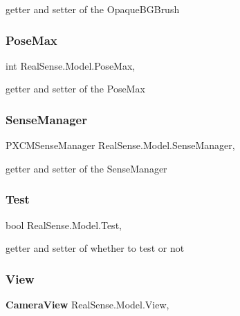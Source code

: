 getter and setter of the Opaque\+B\+G\+Brush \mbox{\label{class_real_sense_1_1_model_a556c083ee213249d05c2383ffc8e46f4}} 
\subsubsection{Pose\+Max}
{\footnotesize\ttfamily int Real\+Sense.\+Model.\+Pose\+Max\hspace{0.3cm}{\ttfamily [get]}, {\ttfamily [set]}}

getter and setter of the Pose\+Max \mbox{\label{class_real_sense_1_1_model_a396ec458576859184ac7e39d9be13465}} 
\subsubsection{Sense\+Manager}
{\footnotesize\ttfamily P\+X\+C\+M\+Sense\+Manager Real\+Sense.\+Model.\+Sense\+Manager\hspace{0.3cm}{\ttfamily [get]}, {\ttfamily [set]}}

getter and setter of the Sense\+Manager \mbox{\label{class_real_sense_1_1_model_a89f4614b0f880fb6553ebcea3d2e6a6c}} 
\subsubsection{Test}
{\footnotesize\ttfamily bool Real\+Sense.\+Model.\+Test\hspace{0.3cm}{\ttfamily [get]}, {\ttfamily [set]}}

getter and setter of whether to test or not \mbox{\label{class_real_sense_1_1_model_ad06548f5b1e3b3bfeaca2635d2b24fc6}} 
\subsubsection{View}
{\footnotesize\ttfamily \textbf{ Camera\+View} Real\+Sense.\+Model.\+View\hspace{0.3cm}{\ttfamily [get]}, {\ttfamily [set]}}

